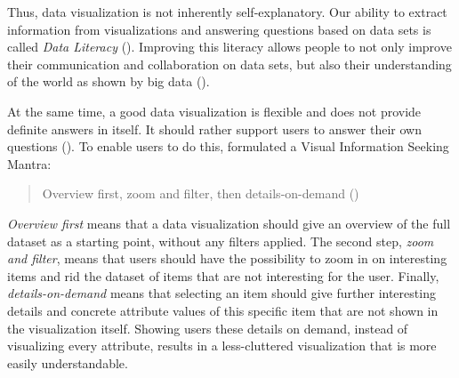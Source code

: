 Thus, data visualization is not inherently self-explanatory. Our ability to extract information from visualizations and answering questions based on data sets is called \emph{Data Literacy} (\cite{boyPrincipledWayAssessing2014}). Improving this literacy allows people to not only improve their communication and collaboration on data sets, but also their understanding of the world as shown by big data (\cite{bornerDataVisualizationLiteracy2019}).

At the same time, a good data visualization is flexible and does not provide definite answers in itself. It should rather support users to answer their own questions (\cite{light2001portable}). To enable users to do this, \citeauthor{shneidermanEyesHaveIt1996} formulated a Visual Information Seeking Mantra:

\begin{quote}
    Overview first, zoom and filter, then details-on-demand (\cite[337]{shneidermanEyesHaveIt1996})
\end{quote}

\emph{Overview first} means that a data visualization should give an overview of the full dataset as a starting point, without any filters applied. The second step, \emph{zoom and filter}, means that users should have the possibility to zoom in on interesting items and rid the dataset of items that are not interesting for the user. Finally, \emph{details-on-demand} means that selecting an item should give further interesting details and concrete attribute values of this specific item that are not shown in the visualization itself. Showing users these details on demand, instead of visualizing every attribute, results in a less-cluttered visualization that is more easily understandable.

